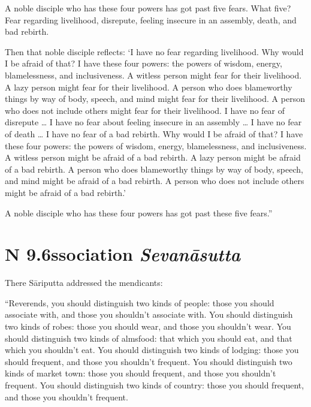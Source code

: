 \documentclass[12pt,openany]{book}%
\newcommand*{\suttatitleacronym}[1]{\smaller[2]{#1}\vspace*{.3em}}
\newcommand*{\suttatitletranslation}[1]{\linebreak{#1}}
\newcommand*{\suttatitleroot}[1]{\linebreak\smaller[2]\itshape{#1}}
\newcommand*{\tocacronym}[1]{\hspace*{-3.3em}{#1}\quad}
\newcommand*{\toctranslation}[1]{#1}
\newcommand*{\tocroot}[1]{(\textit{#1})}
\begin{document}
A noble disciple who has these four powers has got past five fears. What five? Fear regarding livelihood, disrepute, feeling insecure in an assembly, death, and bad rebirth. 

Then that noble disciple reflects: ‘I have no fear regarding livelihood. Why would I be afraid of that? I have these four powers: the powers of wisdom, energy, blamelessness, and inclusiveness. A witless person might fear for their livelihood. A lazy person might fear for their livelihood. A person who does blameworthy things by way of body, speech, and mind might fear for their livelihood. A person who does not include others might fear for their livelihood. I have no fear of disrepute … I have no fear about feeling insecure in an assembly … I have no fear of death … I have no fear of a bad rebirth. Why would I be afraid of that? I have these four powers: the powers of wisdom, energy, blamelessness, and inclusiveness. A witless person might be afraid of a bad rebirth. A lazy person might be afraid of a bad rebirth. A person who does blameworthy things by way of body, speech, and mind might be afraid of a bad rebirth. A person who does not include others might be afraid of a bad rebirth.’ 

A noble disciple who has these four powers has got past these five fears.” 

%
\section*{{\suttatitleacronym AN 9.6}{\suttatitletranslation Association }{\suttatitleroot Sevanāsutta}}
\addcontentsline{toc}{section}{\tocacronym{AN 9.6} \toctranslation{Association } \tocroot{Sevanāsutta}}

There \textsanskrit{Sāriputta} addressed the mendicants: 

“Reverends, you should distinguish two kinds of people: those you should associate with, and those you shouldn’t associate with. You should distinguish two kinds of robes: those you should wear, and those you shouldn’t wear. You should distinguish two kinds of almsfood: that which you should eat, and that which you shouldn’t eat. You should distinguish two kinds of lodging: those you should frequent, and those you shouldn’t frequent. You should distinguish two kinds of market town: those you should frequent, and those you shouldn’t frequent. You should distinguish two kinds of country: those you should frequent, and those you shouldn’t frequent. 
\end{document}
